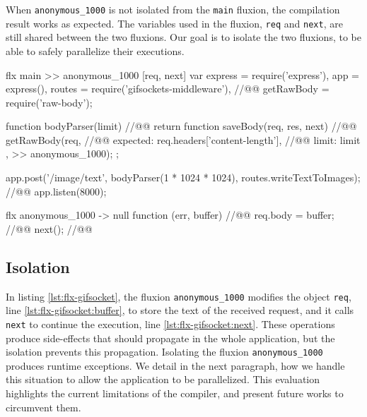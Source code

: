 
When \texttt{anonymous\-\_1000} is not isolated from the \texttt{main} fluxion, the compilation result works as expected.
The variables used in the fluxion, \texttt{req} and \texttt{next}, are still shared between the two fluxions.
Our goal is to isolate the two fluxions, to be able to safely parallelize their executions.

\begin{code}[flx, caption={Compilation result of gifsockets-server},label={lst:flx-gifsocket}]
flx main
>> anonymous_1000 [req, next]
  var express = require('express'),
      app = express(),
      routes = require('gifsockets-middleware'), //@\label{lst:flx-gifsocket:gif-mw}@
      getRawBody = require('raw-body');

  function bodyParser(limit) { //@\label{lst:flx-gifsocket:bodyParser}@
    return function saveBody(req, res, next) { //@\label{lst:flx-gifsocket:saveBody}@
      getRawBody(req, { //@\label{lst:flx-gifsocket:getRawBody}@
        expected: req.headers['content-length'], //@\label{lst:flx-gifsocket:req.headers}@
        limit: limit
      }, >> anonymous_1000);
    };
  }

  app.post('/image/text', bodyParser(1 * 1024 * 1024), routes.writeTextToImages); //@\label{lst:flx-gifsocket:app.post}@
  app.listen(8000);

flx anonymous_1000
-> null
  function (err, buffer) { //@\label{lst:flx-gifsocket:callback}@
    req.body = buffer; //@\label{lst:flx-gifsocket:buffer}@
    next(); //@\label{lst:flx-gifsocket:next}@
  }
\end{code}

\subsection{Isolation}

In listing \ref{lst:flx-gifsocket}, the fluxion \texttt{anonymous\_1000} modifies the object \texttt{req}, line \ref{lst:flx-gifsocket:buffer}, to store the text of the received request, and it calls \texttt{next} to continue the execution, line \ref{lst:flx-gifsocket:next}.
These operations produce side-effects that should propagate in the whole application, but the isolation prevents this propagation.
Isolating the fluxion \texttt{anonymous\_1000} produces runtime exceptions.
We detail in the next paragraph, how we handle this situation to allow the application to be parallelized.
This evaluation highlights the current limitations of the compiler, and present future works to circumvent them.

